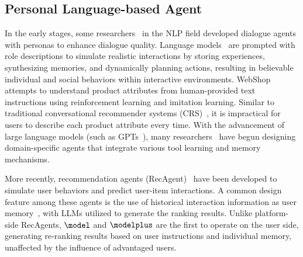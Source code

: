 \subsection{Personal Language-based Agent}
In the early stages, some researchers~\citep{zhang2018personalizing, park2023generative, shanahan2023role} in the NLP field developed dialogue agents with personas to enhance dialogue quality. Language models~\citep{park2023generative} are prompted with role descriptions to simulate realistic interactions by storing experiences, synthesizing memories, and dynamically planning actions, resulting in believable individual and social behaviors within interactive environments. 
WebShop~\citep{webshop} attempts to understand product attributes from human-provided text instructions using reinforcement learning and imitation learning. Similar to traditional conversational recommender systems (CRS)~\citep{zhang2018CRS}, it is impractical for users to describe each product attribute every time. With the advancement of large language models (such as GPTs~\citep{gpt4}), many researchers~\citep{webagent,mind2web,travelagent,mei2024aios} have begun designing domain-specific agents that integrate various tool learning and memory mechanisms.

More recently, recommendation agents (RecAgent)~\citep{toolrec,wang2023recmind,generativerecagent,agentcf,wang2024macrec,huang2023recommender} have been developed to simulate user behaviors and predict user-item interactions. A common design feature among these agents is the use of historical interaction information as user memory~\citep{toolrec,wang2023recmind,huang2023recommender}, with LLMs utilized to generate the ranking results. Unlike platform-side RecAgents, $\model$ and $\modelplus$ are the first to operate on the user side, generating re-ranking results based on user instructions and individual memory, unaffected by the influence of advantaged users.












% 
% 



\clearpage
\onecolumn